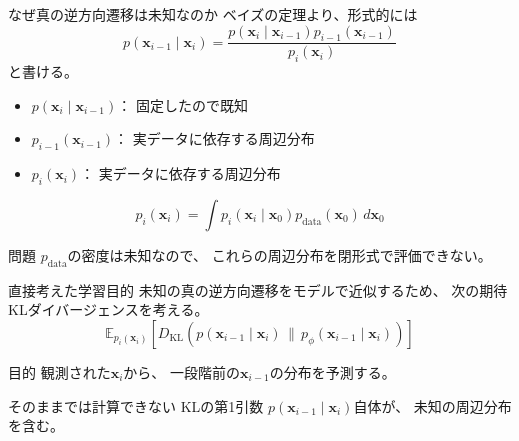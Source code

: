 \begin{frame}{なぜ真の逆方向遷移は未知なのか}
    ベイズの定理より、形式的には
    \[
        p(\boldsymbol{x}_{i-1}\mid\boldsymbol{x}_i)
        =
        \frac{
        p(\boldsymbol{x}_i\mid\boldsymbol{x}_{i-1})
        p_{i-1}(\boldsymbol{x}_{i-1})
        }{
        p_i(\boldsymbol{x}_i)
        }
    \]
    と書ける。
    \begin{itemize}
        \item $p(\boldsymbol{x}_i\mid\boldsymbol{x}_{i-1})$：
        固定したので既知
        \item $p_{i-1}(\boldsymbol{x}_{i-1})$：
        実データに依存する周辺分布
        \item $p_i(\boldsymbol{x}_i)$：
        実データに依存する周辺分布
    \end{itemize}
    \[
        p_i(\boldsymbol{x}_i)
        =
        \int
        p_i(\boldsymbol{x}_i\mid\boldsymbol{x}_0)
        p_{\mathrm{data}}(\boldsymbol{x}_0)
        \,d\boldsymbol{x}_0
    \]
    \begin{alertblock}{問題}
        $p_{\mathrm{data}}$の密度は未知なので、
        これらの周辺分布を閉形式で評価できない。
    \end{alertblock}
\end{frame}
\begin{frame}{直接考えた学習目的}
    未知の真の逆方向遷移をモデルで近似するため、
    次の期待KLダイバージェンスを考える。
    \[
        \boxed{
        \mathbb{E}_{p_i(\boldsymbol{x}_i)}
        \left[
        D_{\mathrm{KL}}\!\left(
        p(\boldsymbol{x}_{i-1}\mid\boldsymbol{x}_i)
        \,\|\,
        p_\phi(\boldsymbol{x}_{i-1}\mid\boldsymbol{x}_i)
        \right)
        \right]
        }
        \tag{2.2.2}
    \]
    \begin{exampleblock}{目的}
        観測された$\boldsymbol{x}_i$から、
        一段階前の$\boldsymbol{x}_{i-1}$の分布を予測する。
    \end{exampleblock}
    \begin{alertblock}{そのままでは計算できない}
        KLの第1引数
        $p(\boldsymbol{x}_{i-1}\mid\boldsymbol{x}_i)$自体が、
        未知の周辺分布を含む。
    \end{alertblock}
\end{frame}
